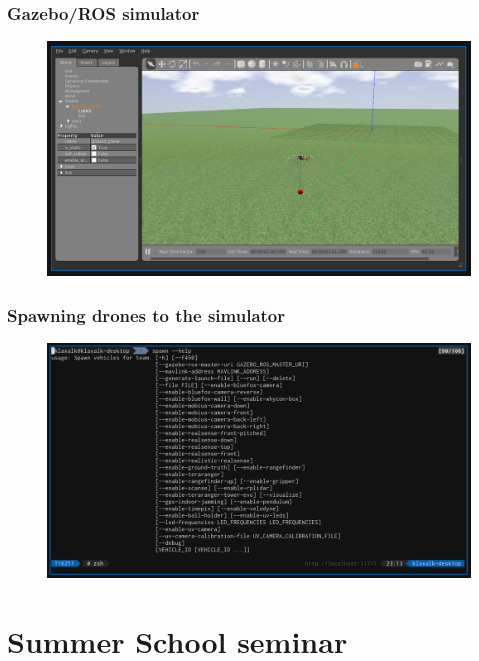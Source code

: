 \documentclass[aspectratio=1610]{beamer}
\begin{document}
\begin{frame}
  \frametitle{Gazebo/ROS simulator}

  \begin{figure}
    \includegraphics[width=1.0\textwidth]{./fig/gazebo.png}
  \end{figure}

\end{frame}

\begin{frame}
  \frametitle{Spawning drones to the simulator}

  \begin{figure}
    \includegraphics[width=1.0\textwidth]{./fig/spawn.png}
  \end{figure}

\end{frame}


\section{Summer School seminar}
\end{document}
